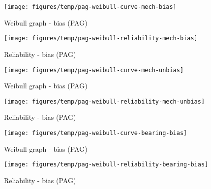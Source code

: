 \documentclass[fleqn]{article}
\begin{document}
\begin{figure}[!htb]
	\begin{minipage}[b]{0.5\linewidth}
		\centering
		\texttt{[image: figures/temp/pag-weibull-curve-mech-bias]}
		\caption{Weibull graph - bias (PAG)}
		\label{vil-weibull-graph-vil-bearing-unbias}
	\end{minipage}
	\hspace{0.05cm}
	\begin{minipage}[b]{0.5\linewidth}
		\centering
		\texttt{[image: figures/temp/pag-weibull-reliability-mech-bias]}
		\caption{Reliability - bias (PAG)}
		\label{vil-weibull-graph-vil-reliability-unbias}
	\end{minipage}
\end{figure}



\begin{figure}[!htb]
	\begin{minipage}[b]{0.5\linewidth}
		\centering
		\texttt{[image: figures/temp/pag-weibull-curve-mech-unbias]}
		\caption{Weibull graph - bias (PAG)}
		\label{vil-weibull-graph-vil-bearing-unbias}
	\end{minipage}
	\hspace{0.05cm}
	\begin{minipage}[b]{0.5\linewidth}
		\centering
		\texttt{[image: figures/temp/pag-weibull-reliability-mech-unbias]}
		\caption{Reliability - bias (PAG)}
		\label{vil-weibull-graph-vil-reliability-unbias}
	\end{minipage}
\end{figure}


\begin{figure}[!htb]
	\begin{minipage}[b]{0.5\linewidth}
		\centering
		\texttt{[image: figures/temp/pag-weibull-curve-bearing-bias]}
		\caption{Weibull graph - bias (PAG)}
		\label{vil-weibull-graph-vil-bearing-unbias}
	\end{minipage}
	\hspace{0.05cm}
	\begin{minipage}[b]{0.5\linewidth}
		\centering
		\texttt{[image: figures/temp/pag-weibull-reliability-bearing-bias]}
		\caption{Reliability - bias (PAG)}
		\label{vil-weibull-graph-vil-reliability-unbias}
	\end{minipage}
\end{figure}
\end{document}
